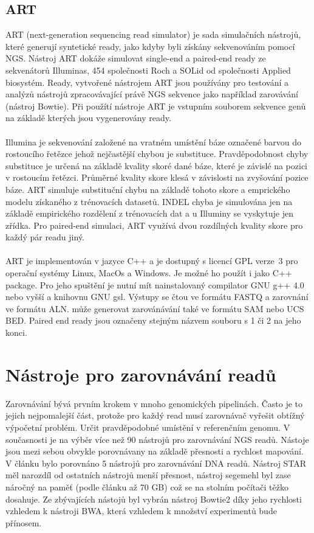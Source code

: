 \documentclass[czech,DP]{thesiskiv}
\numberwithin{equation}{section}
\begin{document}
\subsection{ART}
ART (next-generation sequencing read simulator) je sada simulačních nástrojů, které generují syntetické ready, jako kdyby byli získány sekvenováním pomocí NGS. Nástroj ART dokáže simulovat single-end a paired-end ready ze sekvenátorů Illuminas, 454 společnosti Roch a SOLid od společnosti Applied biosystém. Ready, vytvořené nástrojem ART jsou používány pro testování a analýzů nástrojů zpracovávající právě NGS sekvence jako například zarovávání (nástroj Bowtie). Při použítí nástroje ART je vstupním souborem sekvence genů na základě kterých jsou vygenerovány ready. \cite{art}
\\
\\
Illumina je sekvenování založené na vratném umístění báze označené barvou do rostoucího řetězce jehož nejčastější chybou je substituce. Pravděpodobnost chyby substituce je určená na základě kvality skoré dané báze, které je závislé na pozici v rostoucím řetězci. Průměrné kvality skore klesá v závislosti na zvyšování pozice báze. ART simuluje substituční chybu na základě tohoto skore a emprického modelu získaného z trénovacích datasetů. INDEL chyba je simulována jen na základě empirického rozdělení z trénovacích dat a u Illuminy se vyskytuje jen zřídka. Pro paired-end simulaci, ART využívá dvou rozdílných kvality skore pro každý pár readu jiný. 
\\
\\
ART je implementován v jazyce C++ a je dostupný s licencí GPL verze~3 pro operační systémy Linux, MacOs a Windows. Je možné ho použít i jako C++ package. Pro jeho spuštění je nutní mít nainstalovaný compilator GNU g++ 4.0 nebo vyšší a knihovnu GNU gsl. Výstupy se čtou ve formátu FASTQ a zarovnání ve formátu ALN. může generovat zarovánávání také ve formátu SAM nebo UCS BED. Paired end ready jsou označeny stejným názvem souboru s 1 či 2 na jeho konci.

\section{Nástroje pro zarovnávání readů}
Zarovnávání bývá prvním krokem v mnoho genomických pipelinách. Často je to jejich nejpomalejší část, protože pro každý read musí zarovnávač vyřešit obtížný výpočetní problém. Určit pravděpodobné umístění v referenčním genomu. 
V současnosti je na výběr více než 90 nástrojů pro zarovnávání NGS readů.
Nástoje jsou mezi sebou obvykle porovnávany na základě přesnosti a rychlost mapování. V článku \cite{ngs_alignment_software} bylo porovnáno 5 nástrojů pro zarovnávání DNA readů.  Nástroj STAR měl narozdíl od ostatních nástrojů menší přesnost, nástroj segemehl byl zase náročný na paměť (podle článku až 70 GB) což se na stolním počítači těžko dosahuje. Ze zbývajících nástojů byl vybrán nástroj Bowtie2 díky jeho rychlosti vzhledem k nástroji BWA, která vzhledem k množství experimentů bude přínosem.  
\end{document}
